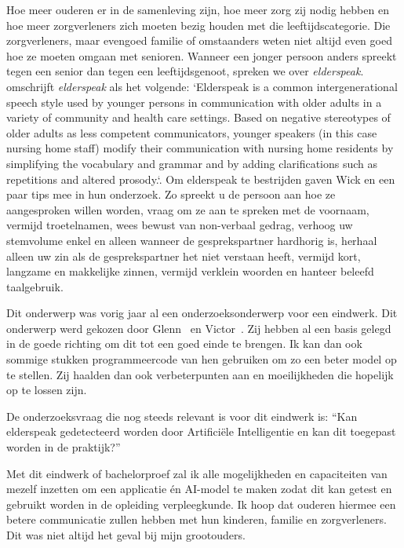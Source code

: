 Hoe meer ouderen er in de samenleving zijn, hoe meer zorg zij nodig hebben en hoe meer zorgverleners zich moeten bezig houden met die leeftijdscategorie. Die zorgverleners, maar evengoed familie of omstaanders weten niet altijd even goed hoe ze moeten omgaan met senioren. Wanneer een jonger persoon anders spreekt tegen een senior dan tegen een leeftijdsgenoot, spreken we over \textit{elderspeak}. \textcite{Williams2011} omschrijft \textit{elderspeak} als het volgende: `Elderspeak is a common intergenerational speech style used by younger persons in communication with older adults in a variety of community and health care settings. Based on negative stereotypes of older adults as less competent communicators, younger speakers (in this case nursing home staff) modify their communication with nursing home residents by simplifying the vocabulary and grammar and by adding clarifications such as repetitions and altered prosody.`. Om elderspeak te bestrijden gaven Wick en \textcite{Wick2007} een paar tips mee in hun onderzoek. Zo spreekt u de persoon aan hoe ze aangesproken willen worden, vraag om ze aan te spreken met de voornaam, vermijd troetelnamen, wees bewust van non-verbaal gedrag, verhoog uw stemvolume enkel en alleen wanneer de gesprekspartner hardhorig is, herhaal alleen uw zin als de gesprekspartner het niet verstaan heeft, vermijd kort, langzame en makkelijke zinnen, vermijd verklein woorden en hanteer beleefd taalgebruik.

Dit onderwerp was vorig jaar al een onderzoeksonderwerp voor een eindwerk. Dit onderwerp werd gekozen door Glenn~\textcite{Beeckman2021} en Victor~\textcite{Standaert2021}. Zij hebben al een basis gelegd in de goede richting om dit tot een goed einde te brengen. Ik kan dan ook sommige stukken programmeercode van hen gebruiken om zo een beter model op te stellen. Zij haalden dan ook verbeterpunten aan en moeilijkheden die hopelijk op te lossen zijn.

De onderzoeksvraag die nog steeds relevant is voor dit eindwerk is: ``Kan elderspeak gedetecteerd worden door Artificiële Intelligentie en kan dit toegepast worden in de praktijk?''

Met dit eindwerk of bachelorproef zal ik alle mogelijkheden en capaciteiten van mezelf inzetten om een applicatie én AI-model te maken zodat dit kan getest en gebruikt worden in de opleiding verpleegkunde. Ik hoop dat ouderen hiermee een betere communicatie zullen hebben met hun kinderen, familie en zorgverleners. Dit was niet altijd het geval bij mijn grootouders.


